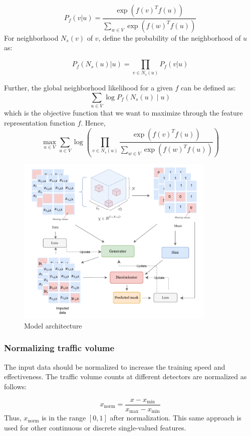 \begin{enumerate}[(i)]
    \[
        P_f(v|u) = \frac{\exp(f(v)^T f(u))}{\sum_{w \in V} \exp(f(w)^T f(u))} \tag{1}
    \]
    For neighborhood \( N_s(v) \) of \( v \), define the probability of the neighborhood of \( u \) as:
    
    \[ P_f(N_s(u)|u) = \prod_{v \in N_s(u)} P_f(v|u) \tag{2} \]

    Further, the global neighborhood likelihood for a given \( f \) can be defined as:
\[ \sum_{u \in V} \log P_f(N_s(u) \mid u) \tag{3} \]
which is the objective function that we want to maximize through the feature representation function \(f\). Hence,
\[ \max_{u \in V} \sum_{u \in V} \log \left( \prod_{v \in N_s(u)} \frac{\exp(f(v)^T f(u))}{\sum_{w \in V} \exp(f(w)^T f(u))} \right) \tag{4} \]

\end{enumerate}

\begin{figure}[htbp]
  \centering
  \includegraphics[width=0.85\textwidth]{model.pdf}
  \caption{Model architecture}
  \label{fig:dataset}
\end{figure}

\subsubsection{Normalizing traffic volume}\label{subsubsec:normal}
The input data should be normalized to increase the training speed and effectiveness. The traffic volume counts at different detectors are normalized as follows:

\[ x_{\text{norm}} = \frac{x - x_{\text{min}}}{x_{\text{max}} - x_{\text{min}}} \]
Thus, \( x_{\text{norm}} \) is in the range \([0,1]\) after normalization.
This same approach is used for other continuous or discrete single-valued features.

